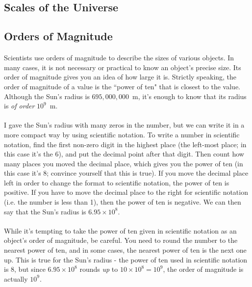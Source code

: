 \documentclass[12pt]{article}
\begin{document}
\begin{flushleft}
\section{Scales of the Universe}
\subsection{Orders of Magnitude}
\paragraph{}
Scientists use orders of magnitude to describe the sizes of various objects.  In many cases, it is not necessary or practical to know an object's precise size. Its order of magnitude gives you an idea of how large it is.  Strictly speaking, the order of magnitude of a value is the ``power of ten" that is closest to the value.  Although the Sun's radius is $695,000,000$~m, it's enough to know that its radius is \emph{of order} $10^9$~m. 
\paragraph{}
I gave the Sun's radius with many zeros in the number, but we can write it in a more compact way by using scientific notation.  To write a number in scientific notation, find the first non-zero digit in the highest place (the left-most place; in this case it's the 6), and put the decimal point after that digit.  Then count how many places you moved the decimal place, which gives you the power of ten (in this case it's 8; convince yourself that this is true).  If you move the decimal place left in order to change the format to scientific notation, the power of ten is positive.  If you have to move the decimal place to the right for scientific notation (i.e. the number is less than 1), then the power of ten is negative.  We can then say that the Sun's radius is $6.95\times10^8$.  
\paragraph{}
While it's tempting to take the power of ten given in scientific notation as an object's order of magnitude, be careful.  You need to round the number to the nearest power of ten, and in some cases, the nearest power of ten is the next one up.  This is true for the Sun's radius - the power of ten used in scientific notation is 8, but since $6.95\times10^8$ rounds \emph{up} to $10\times10^8 = 10^9$, the order of magnitude is actually $10^9$.  

\end{flushleft}
\end{document}
